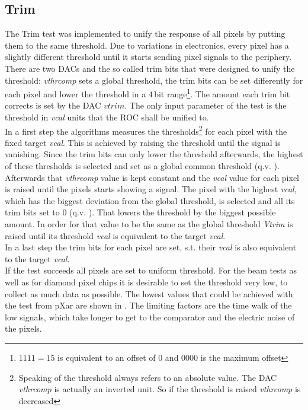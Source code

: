 \documentclass[british,11pt,a4paper]{memoir}
\begin{document}
\subsection{Trim}\label{strim}
The Trim test was implemented to unify the response of all pixels by putting them to the same threshold. Due to variations in electronics, every pixel has a slightly different threshold until it starts sending pixel signals to the periphery.\\
There are two \ac{DAC}s and the so called trim bits that were designed to unify the threshold: \textit{vthrcomp} sets a global threshold, the trim bits can be set differently for each pixel and lower the threshold in a $4\,$bit range\footnote{$1111=15$ is equivalent to an offset of $0$ and $0000$ is the maximum offset}. The amount each trim bit corrects is set by the \ac{DAC} $vtrim$. The only input parameter of the test is the threshold in \textit{vcal} units that the \ac{ROC} shall be unified to.\\
In a first step the algorithms measures the thresholds\footnote{Speaking of the threshold always refers to an absolute value. The \ac{DAC} \textit{vthrcomp} is actually an inverted unit. So if the threshold is raised \textit{vthrcomp} is decreased} for each pixel with the fixed target \textit{vcal}. This is achieved by raising the threshold until the signal is vanishing. Since the trim bits can only lower the threshold afterwards, the highest of these thresholds is selected and set as a global common threshold (q.v. ).\\
Afterwards that \textit{vthrcomp} value is kept constant and the \textit{vcal} value for each pixel is raised until the pixels starts showing a signal. The pixel with the highest \textit{vcal}, which has the biggest deviation from the global threshold, is selected and all its trim bits set to $0$ (q.v. ). That lowers the threshold by the biggest possible amount. In order for that value to be the same as the global threshold \textit{Vtrim} is raised until its threshold \textit{vcal} is equivalent to the target  \textit{vcal}.\\
In a last step the trim bits for each pixel are set, s.t. their \textit{vcal} is also equivalent to the target \textit{vcal}.\\
If the test succeeds all pixels are set to uniform threshold. For the beam tests as well as for diamond pixel chips it is desirable to set the threshold very low, to collect as much data as possible. The lowest values that could be achieved with the test from pXar are shown in . The limiting factors are the time walk of the low signals, which take longer to get to the comparator and the electric noise of the pixels.
\end{document}
